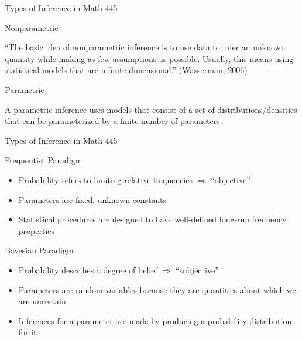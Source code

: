 \documentclass[10pt]{beamer}
\begin{document}
\begin{frame}[fragile]{Types of Inference in Math 445}


\begin{alertblock}{Nonparametric}

``The basic idea of nonparametric inference is to use data to infer an unknown quantity while making as few assumptions as possible. Usually, this means using statistical models that are infinite-dimensional.''  (Wasserman, 2006)

\end{alertblock}

\vfill 

\begin{alertblock}{Parametric}

A parametric inference uses models that consist of a set of distributions/densities that can be parameterized by a finite number of parameters.

\end{alertblock}

\end{frame}

\begin{frame}[fragile]{Types of Inference in Math 445}


\begin{alertblock}{Frequentist Paradigm}

\begin{itemize}
\item Probability refers to limiting relative frequencies $\Longrightarrow$ ``objective''
\item Parameters are fixed, unknown constants
\item Statistical procedures are designed to have well-defined long-run frequency properties
\end{itemize}

\end{alertblock}

\vfill

\begin{alertblock}{Bayesian Paradigm}

\begin{itemize}
\item Probability describes a degree of belief $\Longrightarrow$ ``subjective''
\item Parameters are random variables because they are quantities about which we are uncertain
\item Inferences for a parameter are made by producing a probability distribution for it 
\end{itemize}

\end{alertblock}



\end{frame}
\end{document}
